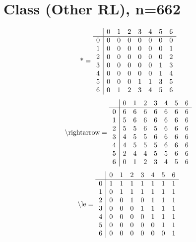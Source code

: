 \documentclass[11pt]{article}
\begin{document}
\section{Class (Other RL), n=662}
\[\text{*} = 
\begin{array}{r | r r r r r r r}
 & 0 & 1 & 2 & 3 & 4 & 5 & 6 \\ \hline
0 & 0 & 0 & 0 & 0 & 0 & 0 & 0 \\
1 & 0 & 0 & 0 & 0 & 0 & 0 & 1 \\
2 & 0 & 0 & 0 & 0 & 0 & 0 & 2 \\
3 & 0 & 0 & 0 & 0 & 0 & 1 & 3 \\
4 & 0 & 0 & 0 & 0 & 0 & 1 & 4 \\
5 & 0 & 0 & 0 & 1 & 1 & 3 & 5 \\
6 & 0 & 1 & 2 & 3 & 4 & 5 & 6 \\
\end{array}
\]
\[\text{\textbackslash rightarrow} = 
\begin{array}{r | r r r r r r r}
 & 0 & 1 & 2 & 3 & 4 & 5 & 6 \\ \hline
0 & 6 & 6 & 6 & 6 & 6 & 6 & 6 \\
1 & 5 & 6 & 6 & 6 & 6 & 6 & 6 \\
2 & 5 & 5 & 6 & 5 & 6 & 6 & 6 \\
3 & 4 & 5 & 5 & 6 & 6 & 6 & 6 \\
4 & 4 & 5 & 5 & 5 & 6 & 6 & 6 \\
5 & 2 & 4 & 4 & 5 & 5 & 6 & 6 \\
6 & 0 & 1 & 2 & 3 & 4 & 5 & 6 \\
\end{array}
\]
\[\text{\textbackslash le} = 
\begin{array}{r | r r r r r r r}
 & 0 & 1 & 2 & 3 & 4 & 5 & 6 \\ \hline
0 & 1 & 1 & 1 & 1 & 1 & 1 & 1 \\
1 & 0 & 1 & 1 & 1 & 1 & 1 & 1 \\
2 & 0 & 0 & 1 & 0 & 1 & 1 & 1 \\
3 & 0 & 0 & 0 & 1 & 1 & 1 & 1 \\
4 & 0 & 0 & 0 & 0 & 1 & 1 & 1 \\
5 & 0 & 0 & 0 & 0 & 0 & 1 & 1 \\
6 & 0 & 0 & 0 & 0 & 0 & 0 & 1 \\
\end{array}
\]
\end{document}
